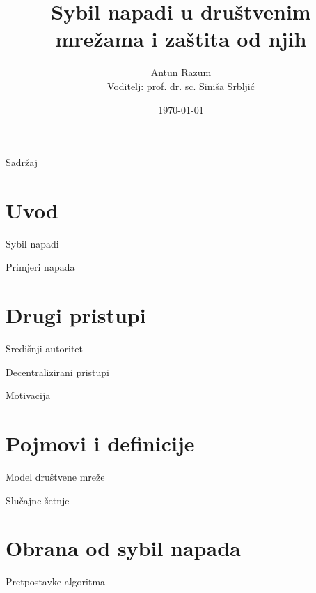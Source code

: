 \documentclass{beamer}
\title{Sybil napadi u društvenim mrežama i zaštita od njih}
\author{Antun Razum\\Voditelj: prof. dr. sc. Siniša Srbljić}
\institute{Fakultet elektrotehnike i računarstva}
\date{\today}
\begin{document}
\maketitle

\begin{frame}{Sadržaj}
  \tableofcontents
\end{frame}

\section{Uvod}

\begin{frame}{Sybil napadi}
\end{frame}

\begin{frame}{Primjeri napada}
\end{frame}

\section{Drugi pristupi}

\begin{frame}{Središnji autoritet}
\end{frame}

\begin{frame}{Decentralizirani pristupi}
\end{frame}

\begin{frame}{Motivacija}
\end{frame}

\section{Pojmovi i definicije}

\begin{frame}{Model društvene mreže}
\end{frame}

\begin{frame}{Slučajne šetnje}
\end{frame}

\section{Obrana od sybil napada}

\begin{frame}{Pretpostavke algoritma}
\end{frame}
\end{document}
